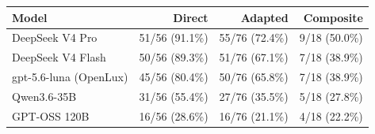 \begin{tabular}{lrrr}
\toprule
\textbf{Model} & \textbf{Direct} & \textbf{Adapted} & \textbf{Composite} \\
\midrule
DeepSeek V4 Pro & 51/56 (91.1\%) & 55/76 (72.4\%) & 9/18 (50.0\%) \\
DeepSeek V4 Flash & 50/56 (89.3\%) & 51/76 (67.1\%) & 7/18 (38.9\%) \\
gpt-5.6-luna (OpenLux) & 45/56 (80.4\%) & 50/76 (65.8\%) & 7/18 (38.9\%) \\
Qwen3.6-35B & 31/56 (55.4\%) & 27/76 (35.5\%) & 5/18 (27.8\%) \\
GPT-OSS 120B & 16/56 (28.6\%) & 16/76 (21.1\%) & 4/18 (22.2\%) \\
\bottomrule
\end{tabular}
